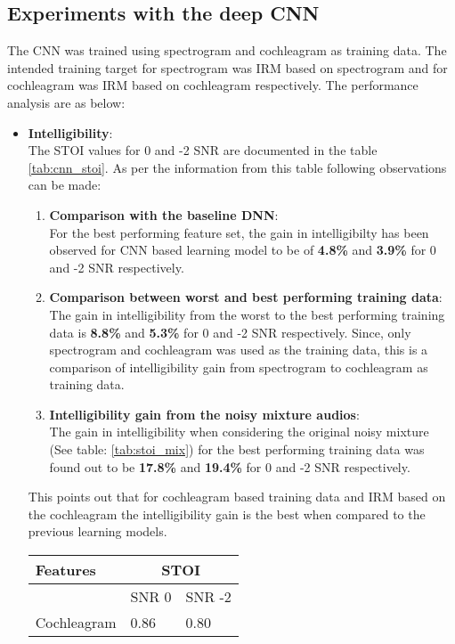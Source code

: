 \subsection{Experiments with the deep CNN}
The CNN was trained using spectrogram and cochleagram as training data. The intended training target for spectrogram was IRM based on spectrogram and for cochleagram was IRM based on cochleagram respectively. The performance analysis are as below:
\begin{itemize}
\item \textbf{Intelligibility}:\\
The STOI values for 0 and -2 SNR are documented in the table \ref{tab:cnn_stoi}. As per the information from this table following observations can be made:
\begin{enumerate}
\item \textbf{Comparison with the baseline DNN}:\\
For the best performing feature set, the gain in intelligibilty has been observed for CNN based learning model to be of \textbf{4.8\%} and \textbf{3.9\%} for 0 and -2 SNR respectively.
\item \textbf{Comparison between worst and best performing training data}:\\
The gain in intelligibility from the worst to the best performing training data is \textbf{8.8\%} and \textbf{5.3\%} for 0 and -2 SNR respectively. Since, only spectrogram and cochleagram was used as the training data, this is a comparison of intelligibility gain from spectrogram to cochleagram as training data.
\item \textbf{Intelligibility gain from the noisy mixture audios}:\\
The gain in intelligibility when considering the original noisy mixture (See table: \ref{tab:stoi_mix}) for the best performing training data was found out to be \textbf{17.8\%} and \textbf{19.4\%} for 0 and -2 SNR respectively.
\end{enumerate}
This points out that for cochleagram based training data and IRM based on the cochleagram the intelligibility gain is the best when compared to the previous learning models.
\begin{table}[!htbp]
\centering
\begin{tabular}{ |p{12cm}|p{1.7cm}|p{1.7cm}|  }
\hline
\textbf{Features} & \multicolumn{2}{|c|}{\textbf{STOI}} \\
\hline
\cellcolor{black} & SNR 0 & SNR -2\\
\hline
\rowcolor[HTML]{ADD8E6}Cochleagram	& 0.86	& 0.80\\

\end{tabular}
\end{table}
\end{itemize}
